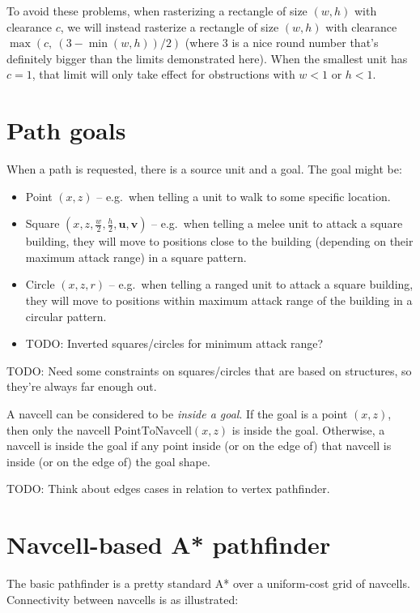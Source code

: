 \documentclass[a4paper,10pt]{article}
\begin{document}
To avoid these problems,
when rasterizing a rectangle of size $(w,h)$ with clearance $c$,
we will instead rasterize a rectangle of size $(w,h)$ with clearance $\max(c,\ (3-\min(w,h))/2)$
(where 3 is a nice round number that's definitely bigger than the limits demonstrated here).
When the smallest unit has $c=1$,
that limit will only take effect for obstructions with $w < 1$ or $h < 1$.

\section{Path goals}

When a path is requested, there is a source unit and a goal.
The goal might be:
\begin{itemize}
 \item Point $(x, z)$ --
 e.g.\ when telling a unit to walk to some specific location.
 \item Square $(x, z, \frac{w}{2}, \frac{h}{2}, \mathbf{u}, \mathbf{v})$ --
 e.g.\ when telling
 a melee unit to attack a square building, they will move to positions close to the building
 (depending on their maximum attack range) in a square pattern.
 \item Circle $(x, z, r)$ --
 e.g.\ when telling
 a ranged unit to attack a square building, they will move to positions within
 maximum attack range of the building in a circular pattern.
 \item TODO: Inverted squares/circles for minimum attack range?
\end{itemize}

TODO: Need some constraints on squares/circles that are based on structures,
so they're always far enough out.

A navcell can be considered to be \emph{inside a goal}.
If the goal is a point $(x, z)$, then only the navcell $\mathrm{PointToNavcell}(x, z)$
is inside the goal.
Otherwise, a navcell is inside the goal if any point inside (or on the edge of) that navcell
is inside (or on the edge of) the goal shape.

TODO: Think about edges cases in relation to vertex pathfinder.

\section{Navcell-based A* pathfinder}

The basic pathfinder is a pretty standard A* over a uniform-cost grid of navcells.
Connectivity between navcells is as illustrated:
\end{document}
